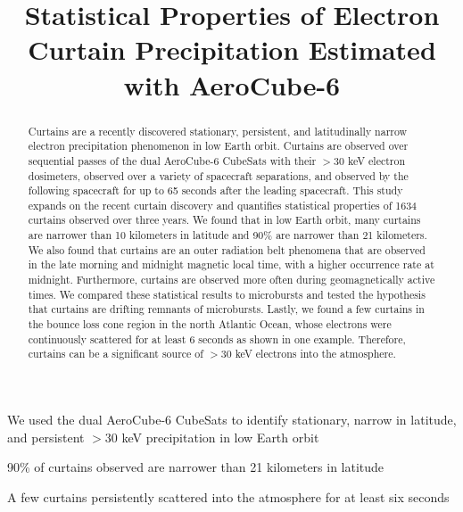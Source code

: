 \documentclass[draft]{agujournal2019}
\begin{document}
\title{Statistical Properties of Electron Curtain Precipitation Estimated with AeroCube-6}

%
%






\begin{keypoints}
\item We used the dual AeroCube-6 CubeSats to identify stationary, narrow in latitude, and persistent $>30$ keV precipitation in low Earth orbit
\item 90\% of curtains observed are narrower than 21 kilometers in latitude
\item A few curtains persistently scattered into the atmosphere for at least six seconds
\end{keypoints}


\begin{abstract}
Curtains are a recently discovered stationary, persistent, and latitudinally narrow electron precipitation phenomenon in low Earth orbit. Curtains are observed over sequential passes of the dual AeroCube-6 CubeSats with their $> 30$ keV electron dosimeters, observed over a variety of spacecraft separations, and observed by the following spacecraft for up to 65 seconds after the leading spacecraft. This study expands on the recent curtain discovery and quantifies statistical properties of 1634 curtains observed over three years. We found that in low Earth orbit, many curtains are narrower than 10 kilometers in latitude and 90\% are narrower than 21 kilometers. We also found that curtains are an outer radiation belt phenomena that are observed in the late morning and midnight magnetic local time, with a higher occurrence rate at midnight. Furthermore, curtains are observed more often during geomagnetically active times. We compared these statistical results to microbursts and tested the hypothesis that curtains are drifting remnants of microbursts. Lastly, we found a few curtains in the bounce loss cone region in the north Atlantic Ocean, whose electrons were continuously scattered for at least 6 seconds as shown in one example. Therefore, curtains can be a significant source of $> 30$ keV electrons into the atmosphere.
\end{abstract}
\end{document}
